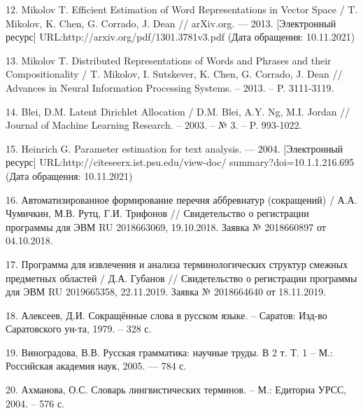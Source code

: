\documentclass[14pt]{extarticle}
\begin{document}
12. Mikolov T. Efficient Estimation of Word Representations in Vector Space / T. Mikolov, K. Chen, G. Corrado, J. Dean // arXiv.org. — 2013. [Электронный ресурс] URL:http://arxiv.org/pdf/1301.3781v3.pdf (Дата обращения: 10.11.2021)

13. Mikolov T. Distributed Representations of Words and Phrases and their Compositionality / T. Mikolov, I. Sutskever, K. Chen, G. Corrado, J. Dean // Advances in Neural Information Processing Systems. – 2013. – P. 3111-3119.

14. Blei, D.M. Latent Dirichlet Allocation / D.M. Blei, A.Y. Ng, M.I. Jordan // Journal of Machine Learning Research. – 2003. – № 3. – P. 993-1022.

15. Heinrich G. Parameter estimation for text analysis. — 2004. [Электронный ресурс] URL:http://citeseerx.ist.psu.edu/view-doc/ summary?doi=10.1.1.216.695 \\
(Дата обращения: 10.11.2021)

16. Автоматизированное формирование перечня аббревиатур (сокращений) / А.А. Чумичкин, М.В. Рутц, Г.И. Трифонов // Свидетельство о регистрации программы для ЭВМ RU 2018663069, 19.10.2018. Заявка № 2018660897 от 04.10.2018.

17. Программа для извлечения и анализа терминологических структур смежных предметных областей / Д.А. Губанов // Свидетельство о регистрации программы для ЭВМ RU 2019665358, 22.11.2019. Заявка № 2018664640 от 18.11.2019.

18. Алексеев, Д.И. Сокращённые слова в русском языке. – Саратов: Изд-во Саратовского ун-та, 1979. – 328 с.

19. Виноградова, В.В. Русская грамматика: научные труды. В 2 т. Т. 1 – М.: Российская академия наук, 2005. — 784 с.

20. Ахманова, О.С. Словарь лингвистических терминов. – М.: Едиториа УРСС, 2004. – 576 с.
\end{document}
